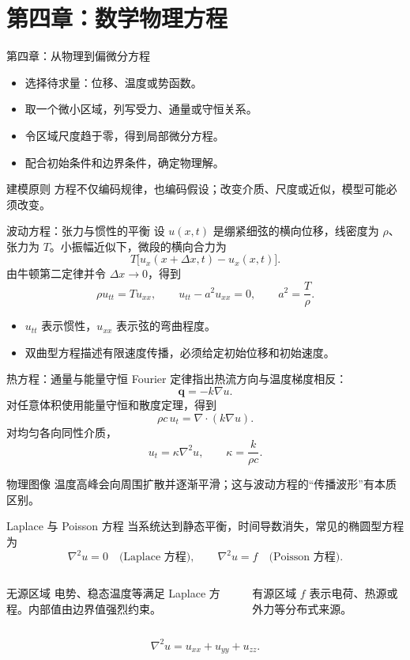 \section{第四章：数学物理方程}

\begin{frame}{第四章：从物理到偏微分方程}
  \begin{itemize}
    \item 选择待求量：位移、温度或势函数。
    \item 取一个微小区域，列写受力、通量或守恒关系。
    \item 令区域尺度趋于零，得到局部微分方程。
    \item 配合初始条件和边界条件，确定物理解。
  \end{itemize}
  \begin{block}{建模原则}
    方程不仅编码规律，也编码假设；改变介质、尺度或近似，模型可能必须改变。
  \end{block}
\end{frame}

\begin{frame}{波动方程：张力与惯性的平衡}
  设 $u(x,t)$ 是绷紧细弦的横向位移，线密度为 $\rho$、张力为 $T$。小振幅近似下，微段的横向合力为
  \[
    T\bigl[u_x(x+\Delta x,t)-u_x(x,t)\bigr].
  \]
  由牛顿第二定律并令 $\Delta x\to0$，得到
  \[
    \rho u_{tt}=Tu_{xx},
    \qquad
    u_{tt}-a^2u_{xx}=0,
    \qquad a^2=\frac{T}{\rho}.
  \]
  \begin{itemize}
    \item $u_{tt}$ 表示惯性，$u_{xx}$ 表示弦的弯曲程度。
    \item 双曲型方程描述有限速度传播，必须给定初始位移和初始速度。
  \end{itemize}
\end{frame}

\begin{frame}{热方程：通量与能量守恒}
  Fourier 定律指出热流方向与温度梯度相反：
  \[
    \mathbf{q}=-k\nabla u.
  \]
  对任意体积使用能量守恒和散度定理，得到
  \[
    \rho c\,u_t=\nabla\cdot(k\nabla u).
  \]
  对均匀各向同性介质，
  \[
    u_t=\kappa\nabla^2u,
    \qquad \kappa=\frac{k}{\rho c}.
  \]
  \begin{block}{物理图像}
    温度高峰会向周围扩散并逐渐平滑；这与波动方程的“传播波形”有本质区别。
  \end{block}
\end{frame}

\begin{frame}{Laplace 与 Poisson 方程}
  当系统达到静态平衡，时间导数消失，常见的椭圆型方程为
  \[
    \nabla^2u=0\quad\text{(Laplace 方程)},
    \qquad
    \nabla^2u=f\quad\text{(Poisson 方程)}.
  \]
  \begin{columns}[T]
    \begin{block}{无源区域}
      电势、稳态温度等满足 Laplace 方程。内部值由边界值强烈约束。
    \end{block}
    \begin{block}{有源区域}
      $f$ 表示电荷、热源或外力等分布式来源。
    \end{block}
  \end{columns}
  \[
    \nabla^2u=u_{xx}+u_{yy}+u_{zz}.
  \]
\end{frame}


